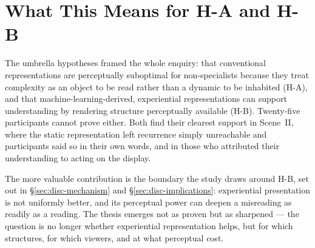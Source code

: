 \section{What This Means for H-A and H-B}
\label{sec:disc-umbrella}

The umbrella hypotheses framed the whole enquiry: that conventional representations are perceptually suboptimal for non-specialists because they treat complexity as an object to be read rather than a dynamic to be inhabited (H-A), and that machine-learning-derived, experiential representations can support understanding by rendering structure perceptually available (H-B). Twenty-five participants cannot prove either. Both find their clearest support in Scene~II, where the static representation left recurrence simply unreachable and participants said so in their own words, and in those who attributed their understanding to acting on the display.

The more valuable contribution is the boundary the study draws around H-B, set out in \S\ref{sec:disc-mechanism} and \S\ref{sec:disc-implications}: experiential presentation is not uniformly better, and its perceptual power can deepen a misreading as readily as a reading. The thesis emerges not as proven but as sharpened --- the question is no longer whether experiential representation helps, but for which structures, for which viewers, and at what perceptual cost.